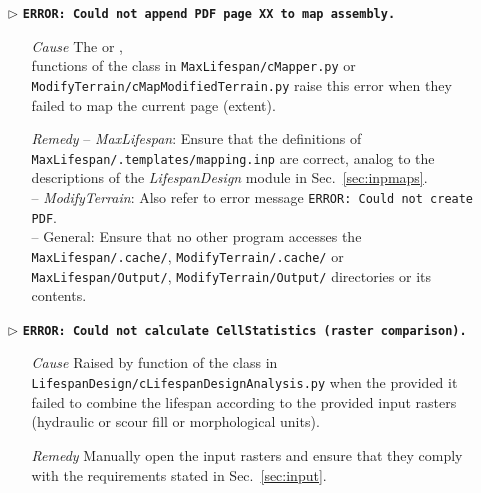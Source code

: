 \begin{itemize}
	\item[$\triangleright$]\textbf{\texttt{ERROR: Could not append PDF page XX to map assembly.}}
	\begin{itemize}
		\item[\textit{Cause}\hspace{0.27cm}] The  or , \\
	 functions of the  class in \texttt{MaxLifespan/cMapper.py} or \texttt{ModifyTerrain/cMapModifiedTerrain.py} raise this error when they failed to map the current page (extent).
		\item[\textit{Remedy}] -- \textit{MaxLifespan}: Ensure that the definitions of \texttt{MaxLifespan/.templates/mapping.inp} are correct, analog to the descriptions of the \textit{LifespanDesign} module in Sec.~\ref{sec:inpmaps}.\\
								 -- \textit{ModifyTerrain}: Also refer to error message \texttt{ERROR: Could not create PDF}.\\
								 -- General: Ensure that no other program accesses the \texttt{MaxLifespan/.cache/}, \texttt{ModifyTerrain/.cache/} or \texttt{MaxLifespan/Output/}, \texttt{ModifyTerrain/Output/} directories or its contents.\\
	\end{itemize}
	
	\item[$\triangleright$]\textbf{\texttt{ERROR: Could not calculate CellStatistics (raster comparison).}}
	\begin{itemize}
		\item[\textit{Cause}\hspace{0.27cm}] Raised by  function of the  class in \texttt{LifespanDesign/cLifespanDesignAnalysis.py} when the provided it failed to combine the lifespan according to the provided input rasters (hydraulic or scour fill or morphological units).
		\item[\textit{Remedy}] Manually open the input rasters and ensure that they comply with the requirements stated in Sec.~\ref{sec:input}.\\
	\end{itemize}
	

\end{itemize}
